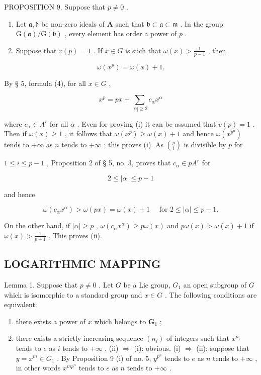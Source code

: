 PROPOSITION 9. Suppose that \(p \neq 0\) .

\begin{enumerate}
\def\labelenumi{(\roman{enumi})}
\item
  Let \(\mathfrak{a},\mathfrak{b}\) be non-zero ideals of \(\mathbf{A}\) such that \(\mathfrak{b} \subset \mathfrak{a} \subset \mathfrak{m}\) . In the group \(\mathrm{G}(\mathfrak{a}) / \mathrm{G}(\mathfrak{b})\) , every element has order a power of \(p\) .
\item
  Suppose that \(v(p) = 1\) . If \(x \in G\) is such that \(\omega(x) > \frac{1}{p - 1}\) , then
\end{enumerate}

\[
\omega (x ^ {p}) = \omega (x) + 1.
\]

By § 5, formula (4), for all \(x \in G\) ,

\[
x ^ {p} = p x + \sum_ {| \alpha | \geqslant 2} c _ {\alpha} x ^ {\alpha}
\]

where \(c_{\alpha} \in A^{r}\) for all \(\alpha\) . Even for proving (i) it can be assumed that \(v(p) = 1\) . Then if \(\omega(x) \geqslant 1\) , it follows that \(\omega(x^{p}) \geqslant \omega(x) + 1\) and hence \(\omega(x^{p^{n}})\) tends to \(+\infty\) as \(n\) tends to \(+\infty\) ; this proves (i). As \(\binom{p}{i}\) is divisible by \(p\) for

\(1 \leqslant i \leqslant p - 1\) , Proposition 2 of § 5, no. 3, proves that \(c_{\alpha} \in pA^{r}\) for

\[
2 \leqslant | \alpha | \leqslant p - 1
\]

and hence

\[
\omega \left(c _ {\alpha} x ^ {\alpha}\right) > \omega (p x) = \omega (x) + 1 \quad \text { for } 2 \leqslant | \alpha | \leqslant p - 1.
\]

On the other hand, if \(|\alpha| \geqslant p\) , \(\omega(c_{\alpha}x^{\alpha}) \geqslant p\omega(x)\) and \(p\omega(x) > \omega(x) + 1\) if \(\omega(x) > \frac{1}{p - 1}\) . This proves (ii).

\subsection{LOGARITHMIC MAPPING}

Lemma 1. Suppose that \(p \neq 0\) . Let \(G\) be a Lie group, \(G_1\) an open subgroup of \(G\) which is isomorphic to a standard group and \(x \in G\) . The following conditions are equivalent:

\begin{enumerate}
\def\labelenumi{(\roman{enumi})}
\item
  there exists a power of \(x\) which belongs to \(\mathbf{G}_1\) ;
\item
  there exists a strictly increasing sequence \((n_{i})\) of integers such that \(x^{n_{i}}\) tends to \(e\) as \(i\) tends to \(+\infty\) .
  (ii) \(\Rightarrow\) (i): obvious.
  (i) \(\Rightarrow\) (ii): suppose that \(y = x^{m} \in G_{1}\) . By Proposition 9 (i) of no. 5, \(y^{p^n}\) tends to \(e\) as \(n\) tends to \(+\infty\) , in other words \(x^{mp^n}\) tends to \(e\) as \(n\) tends to \(+\infty\) .
\end{enumerate}

